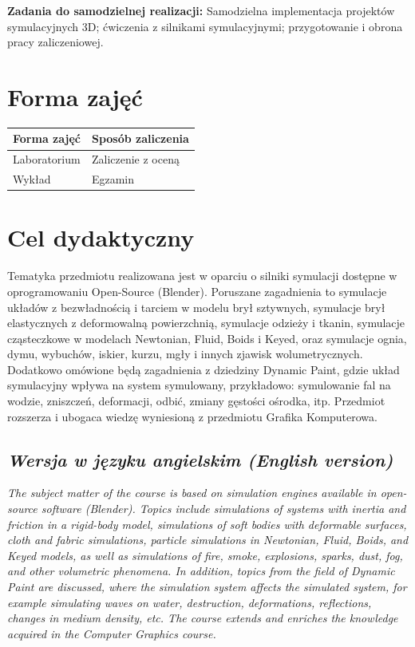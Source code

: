 \documentclass[12pt, a4paper]{article}
\begin{document}
\vspace{4pt}
\noindent\textbf{Zadania do samodzielnej realizacji:} Samodzielna implementacja projektów symulacyjnych 3D; ćwiczenia z silnikami symulacyjnymi; przygotowanie i obrona pracy zaliczeniowej.

\section{Forma zajęć}

\begin{tabular}{ll}
  \hline
  \textbf{Forma zajęć} & \textbf{Sposób zaliczenia} \\
  \hline
  Laboratorium & Zaliczenie z oceną \\
  Wykład & Egzamin \\
  \hline
\end{tabular}

\section{Cel dydaktyczny}

Tematyka przedmiotu realizowana jest w oparciu o silniki symulacji dostępne w oprogramowaniu Open-Source (Blender). Poruszane zagadnienia to symulacje układów z bezwładnością i tarciem w modelu brył sztywnych, symulacje brył elastycznych z deformowalną powierzchnią, symulacje odzieży i tkanin, symulacje cząsteczkowe w modelach Newtonian, Fluid, Boids i Keyed, oraz symulacje ognia, dymu, wybuchów, iskier, kurzu, mgły i innych zjawisk wolumetrycznych. Dodatkowo omówione będą zagadnienia z dziedziny Dynamic Paint, gdzie układ symulacyjny wpływa na system symulowany, przykładowo: symulowanie fal na wodzie, zniszczeń, deformacji, odbić, zmiany gęstości ośrodka, itp. Przedmiot rozszerza i ubogaca wiedzę wyniesioną z przedmiotu Grafika Komputerowa.

\subsection*{\textit{Wersja w języku angielskim (English version)}}

\textit{The subject matter of the course is based on simulation engines available in open-source software (Blender). Topics include simulations of systems with inertia and friction in a rigid-body model, simulations of soft bodies with deformable surfaces, cloth and fabric simulations, particle simulations in Newtonian, Fluid, Boids, and Keyed models, as well as simulations of fire, smoke, explosions, sparks, dust, fog, and other volumetric phenomena. In addition, topics from the field of Dynamic Paint are discussed, where the simulation system affects the simulated system, for example simulating waves on water, destruction, deformations, reflections, changes in medium density, etc. The course extends and enriches the knowledge acquired in the Computer Graphics course.}
\end{document}
